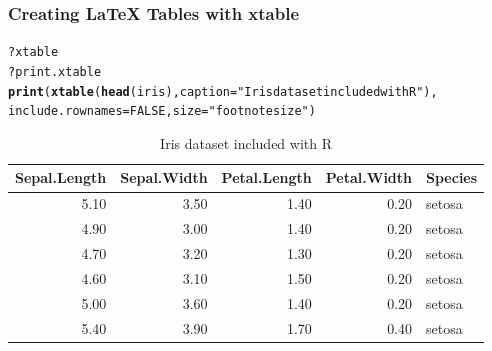 \documentclass{beamer}\usepackage[]{graphicx}\usepackage[]{color}
\makeatletter
\newcommand{\hlnum}[1]{\textcolor[rgb]{0.686,0.059,0.569}{#1}}%
\newcommand{\hlstr}[1]{\textcolor[rgb]{0.192,0.494,0.8}{#1}}%
\newcommand{\hlopt}[1]{\textcolor[rgb]{0,0,0}{#1}}%
\newcommand{\hlstd}[1]{\textcolor[rgb]{0.345,0.345,0.345}{#1}}%
\newcommand{\hlkwc}[1]{\textcolor[rgb]{0.333,0.667,0.333}{#1}}%
\newcommand{\hlkwd}[1]{\textcolor[rgb]{0.737,0.353,0.396}{\textbf{#1}}}%
\newenvironment{kframe}{%
 \def\at@end@of@kframe{}%
 \ifinner\ifhmode%
  \def\at@end@of@kframe{\end{minipage}}%
  \begin{minipage}{\columnwidth}%
 \fi\fi%
 \def\FrameCommand##1{\hskip\@totalleftmargin \hskip-\fboxsep
 \colorbox{shadecolor}{##1}\hskip-\fboxsep
     \hskip-\linewidth \hskip-\@totalleftmargin \hskip\columnwidth}%
 \MakeFramed {\advance\hsize-\width
   \@totalleftmargin\z@ \linewidth\hsize
   \@setminipage}}%
 {\par\unskip\endMakeFramed%
 \at@end@of@kframe}
\newenvironment{knitrout}{}{} %
\makeatother
\begin{document}
\begin{frame}[fragile]
\frametitle{Creating LaTeX Tables with xtable}
\begin{knitrout}\footnotesize
{}\color{fgcolor}\begin{kframe}
\begin{alltt}
\hlopt{?}\hlstd{xtable}
\hlopt{?}\hlstd{print.xtable}
\hlkwd{print}\hlstd{(}\hlkwd{xtable}\hlstd{(}\hlkwd{head}\hlstd{(iris),} \hlkwc{caption}\hlstd{=}\hlstr{"Iris dataset included with R"}\hlstd{),}
      \hlkwc{include.rownames}\hlstd{=}\hlnum{FALSE}\hlstd{,} \hlkwc{size}\hlstd{=}\hlstr{"footnotesize"}\hlstd{)}
\end{alltt}
\end{kframe}
\end{knitrout}


\begin{table}[ht]
\centering
{\footnotesize
\begin{tabular}{rrrrl}
  \hline
Sepal.Length & Sepal.Width & Petal.Length & Petal.Width & Species \\ 
  \hline
5.10 & 3.50 & 1.40 & 0.20 & setosa \\ 
  4.90 & 3.00 & 1.40 & 0.20 & setosa \\ 
  4.70 & 3.20 & 1.30 & 0.20 & setosa \\ 
  4.60 & 3.10 & 1.50 & 0.20 & setosa \\ 
  5.00 & 3.60 & 1.40 & 0.20 & setosa \\ 
  5.40 & 3.90 & 1.70 & 0.40 & setosa \\ 
   \hline
\end{tabular}
}
\caption{Iris dataset included with R} 
\end{table}


\end{frame}

\end{document}

